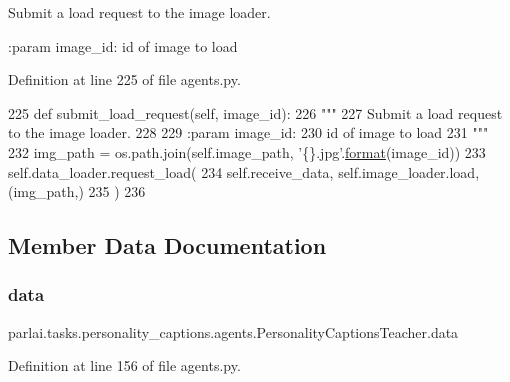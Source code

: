 \begin{DoxyVerb}Submit a load request to the image loader.

:param image_id:
    id of image to load
\end{DoxyVerb}
 

Definition at line 225 of file agents.\+py.


\begin{DoxyCode}
225     \textcolor{keyword}{def }submit\_load\_request(self, image\_id):
226         \textcolor{stringliteral}{"""}
227 \textcolor{stringliteral}{        Submit a load request to the image loader.}
228 \textcolor{stringliteral}{}
229 \textcolor{stringliteral}{        :param image\_id:}
230 \textcolor{stringliteral}{            id of image to load}
231 \textcolor{stringliteral}{        """}
232         img\_path = os.path.join(self.image\_path, \textcolor{stringliteral}{'\{\}.jpg'}.\hyperlink{namespaceparlai_1_1chat__service_1_1services_1_1messenger_1_1shared__utils_a32e2e2022b824fbaf80c747160b52a76}{format}(image\_id))
233         self.data\_loader.request\_load(
234             self.receive\_data, self.image\_loader.load, (img\_path,)
235         )
236 
\end{DoxyCode}


\subsection{Member Data Documentation}
\mbox{\label{classparlai_1_1tasks_1_1personality__captions_1_1agents_1_1PersonalityCaptionsTeacher_ab9c9ef3660e1304eeeaa067f06cf7ab1}} 
\subsubsection{\texorpdfstring{data}{data}}
{\footnotesize\ttfamily parlai.\+tasks.\+personality\+\_\+captions.\+agents.\+Personality\+Captions\+Teacher.\+data}



Definition at line 156 of file agents.\+py.

